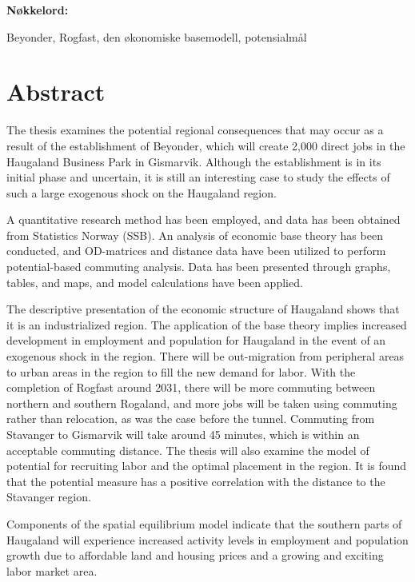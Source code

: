 \documentclass[
]{article}
\begin{document}
\textbf{Nøkkelord:}

Beyonder, Rogfast, den økonomiske basemodell, potensialmål

\newpage

\hypertarget{abstract}{%
\section*{Abstract}\label{abstract}}

The thesis examines the potential regional consequences that may occur
as a result of the establishment of Beyonder, which will create 2,000
direct jobs in the Haugaland Business Park in Gismarvik. Although the
establishment is in its initial phase and uncertain, it is still an
interesting case to study the effects of such a large exogenous shock on
the Haugaland region.

A quantitative research method has been employed, and data has been
obtained from Statistics Norway (SSB). An analysis of economic base
theory has been conducted, and OD-matrices and distance data have been
utilized to perform potential-based commuting analysis. Data has been
presented through graphs, tables, and maps, and model calculations have
been applied.

The descriptive presentation of the economic structure of Haugaland
shows that it is an industrialized region. The application of the base
theory implies increased development in employment and population for
Haugaland in the event of an exogenous shock in the region. There will
be out-migration from peripheral areas to urban areas in the region to
fill the new demand for labor. With the completion of Rogfast around
2031, there will be more commuting between northern and southern
Rogaland, and more jobs will be taken using commuting rather than
relocation, as was the case before the tunnel. Commuting from Stavanger
to Gismarvik will take around 45 minutes, which is within an acceptable
commuting distance. The thesis will also examine the model of potential
for recruiting labor and the optimal placement in the region. It is
found that the potential measure has a positive correlation with the
distance to the Stavanger region.

Components of the spatial equilibrium model indicate that the southern
parts of Haugaland will experience increased activity levels in
employment and population growth due to affordable land and housing
prices and a growing and exciting labor market area.
\end{document}
